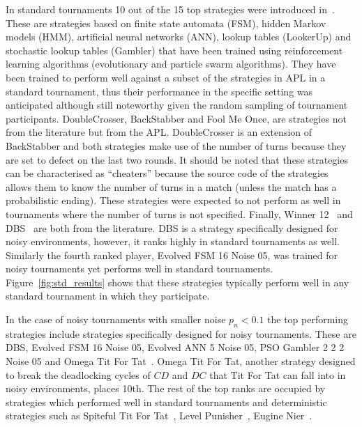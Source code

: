 In standard tournaments 10 out of the 15 top strategies were introduced
in~\cite{Harper2017}. These are strategies based on finite state automata (FSM),
hidden Markov models (HMM), artificial neural networks (ANN), lookup tables
(LookerUp) and stochastic lookup tables (Gambler) that have been trained using
reinforcement learning algorithms (evolutionary and particle swarm algorithms).
They have been trained to perform well against a subset of the strategies
in APL in a standard tournament, thus their performance in the
specific setting was anticipated although still noteworthy given the random
sampling of tournament participants. DoubleCrosser, BackStabber and Fool Me Once, are
strategies not from the literature but from the APL. DoubleCrosser is an extension
of BackStabber and both strategies make use of the number of turns because they are
set to defect on the last two rounds. It should be noted that these
strategies can be characterised as ``cheaters'' because the source code of the strategies
allows them to know the number of turns in a match (unless the match has a probabilistic ending). These strategies were expected to not perform as well in
tournaments where the number of turns is not specified. Finally, Winner
12~\cite{mathieu2017} and DBS~\cite{Au2006} are both from the literature.
DBS is a strategy specifically designed for noisy environments, however, it ranks
highly in standard tournaments as well. Similarly the fourth ranked player,
Evolved FSM 16 Noise 05, was
trained for noisy tournaments yet performs well in standard tournaments.
Figure~\ref{fig:std_results} shows that these strategies typically perform
well in any standard tournament in which they participate.

In the case of noisy tournaments with smaller noise \(p_n < 0.1\) the top
performing strategies
include strategies specifically designed for noisy tournaments. These are DBS,
Evolved FSM 16 Noise 05, Evolved ANN 5 Noise 05, PSO Gambler 2 2 2 Noise 05 and
Omega Tit For Tat~\cite{kendall2007iterated}. Omega Tit For Tat, another strategy designed
to break the deadlocking cycles of \(CD\) and \(DC\) that Tit For Tat can fall into in noisy
environments, places 10th. The rest of the top ranks are
occupied by strategies which performed well in standard tournaments and
deterministic strategies such as Spiteful Tit For Tat~\cite{prison}, Level
Punisher~\cite{Eckhart2015}, Eugine Nier~\cite{lesswrong}.

